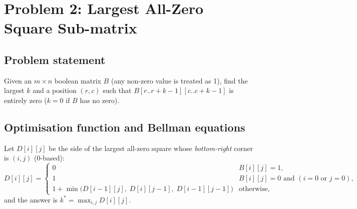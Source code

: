 \documentclass[11pt]{article}
\begin{document}
\clearpage
\section{Problem 2: Largest All-Zero Square Sub-matrix}

\subsection{Problem statement}
Given an $m\times n$ boolean matrix $B$ (any non-zero value is treated as 1),
find the largest $k$ and a position $(r,c)$ such that $B[r..r+k-1][c..c+k-1]$
is entirely zero ($k=0$ if $B$ has no zero).

\subsection{Optimisation function and Bellman equations}
Let $D[i][j]$ be the side of the largest all-zero square whose
\emph{bottom-right} corner is $(i,j)$ (0-based):
\[
D[i][j] = \begin{cases}
0 & B[i][j]=1,\\
1 & B[i][j]=0 \text{ and } (i=0 \text{ or } j=0),\\
1+\min\bigl(D[i-1][j],\; D[i][j-1],\; D[i-1][j-1]\bigr) & \text{otherwise},
\end{cases}
\]
and the answer is $k^\ast=\max_{i,j} D[i][j]$.
\end{document}
